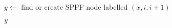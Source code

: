 \begin{algorithmic}   
    \State $y \gets$ find or create SPPF node labelled $(x, i, i + 1)$
    
    \Return $y$
    
    \EndFunction
\end{algorithmic}